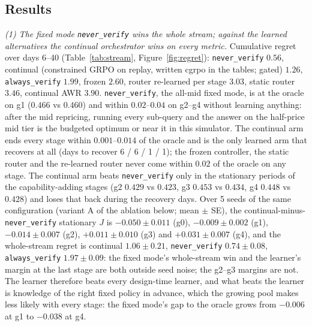\documentclass[10pt]{article}
\newcommand{\code}[1]{\texttt{#1}}
\begin{document}
\subsection{Results}

\emph{(1) The fixed mode \code{never\_verify} wins the whole stream; against the learned alternatives the continual orchestrator wins on every metric.} Cumulative regret over days 6--40 (Table~\ref{tab:stream}, Figure~\ref{fig:regret}): \code{never\_verify} $0.56$, continual (constrained GRPO on replay, written cgrpo in the tables; gated) $1.26$, \code{always\_verify} $1.99$, frozen $2.60$, router re-learned per stage $3.03$, static router $3.46$, continual AWR $3.90$. \code{never\_verify}, the all-mid fixed mode, is at the oracle on g1 ($0.466$ vs $0.460$) and within $0.02$--$0.04$ on g2--g4 without learning anything: after the mid repricing, running every sub-query and the answer on the half-price mid tier is the budgeted optimum or near it in this simulator. The continual arm ends every stage within $0.001$--$0.014$ of the oracle and is the only learned arm that recovers at all (days to recover 6 / 6 / 1 / 1); the frozen controller, the static router and the re-learned router never come within $0.02$ of the oracle on any stage. The continual arm beats \code{never\_verify} only in the stationary periods of the capability-adding stages (g2 $0.429$ vs $0.423$, g3 $0.453$ vs $0.434$, g4 $0.448$ vs $0.428$) and loses that back during the recovery days. Over 5 seeds of the same configuration (variant A of the ablation below; mean $\pm$ SE), the continual-minus-\code{never\_verify} stationary $J$ is $-0.050\pm0.011$ (g0), $-0.009\pm0.002$ (g1), $-0.014\pm0.007$ (g2), $+0.011\pm0.010$ (g3) and $+0.031\pm0.007$ (g4), and the whole-stream regret is continual $1.06\pm0.21$, \code{never\_verify} $0.74\pm0.08$, \code{always\_verify} $1.97\pm0.09$: the fixed mode's whole-stream win and the learner's margin at the last stage are both outside seed noise; the g2--g3 margins are not. The learner therefore beats every design-time learner, and what beats the learner is knowledge of the right fixed policy in advance, which the growing pool makes less likely with every stage: the fixed mode's gap to the oracle grows from $-0.006$ at g1 to $-0.038$ at g4.
\end{document}
